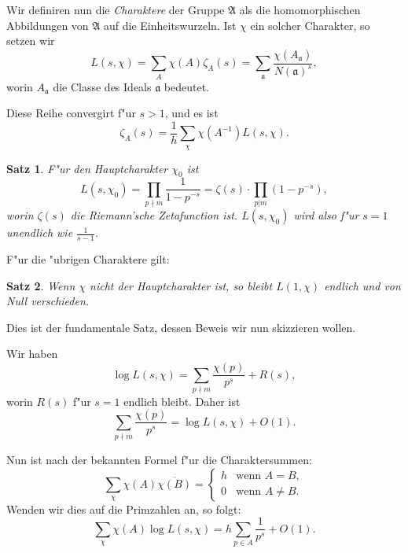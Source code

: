 \documentclass[10pt,a4paper]{article}
\theoremstyle{weberstyle}
\newtheorem{satz}{Satz}[section]
\begin{document}
Wir definiren nun die \emph{Charaktere} der Gruppe $\mathfrak{A}$ als die
homomorphischen Abbildungen von $\mathfrak{A}$ auf die Einheitswurzeln. Ist
$\chi$ ein solcher Charakter, so setzen wir
\begin{equation}\label{eq:nachtrag2.4}
L(s,\chi) = \sum_A \chi(A)\zeta_A(s) =
\sum_{\mathfrak{a}}\frac{\chi(A_{\mathfrak{a}})}{N(\mathfrak{a})^s},
\end{equation}
worin $A_{\mathfrak{a}}$ die Classe des Ideals $\mathfrak{a}$ bedeutet.

Diese Reihe convergirt f"ur $s>1$, und es ist
\begin{equation}\label{eq:nachtrag2.5}
\zeta_A(s) = \frac{1}{h}\sum_{\chi}\chi(A^{-1})L(s,\chi).
\end{equation}

\begin{satz}
F"ur den Hauptcharakter $\chi_0$ ist
\begin{equation}\label{eq:nachtrag2.6}
L(s,\chi_0) = \prod_{p\nmid m}\frac{1}{1-p^{-s}} =
\zeta(s)\cdot\prod_{p|m}(1-p^{-s}),
\end{equation}
worin $\zeta(s)$ die Riemann'sche Zetafunction ist. $L(s,\chi_0)$ wird also
f"ur $s=1$ unendlich wie $\frac{1}{s-1}$.
\end{satz}

F"ur die "ubrigen Charaktere gilt:

\begin{satz}
Wenn $\chi$ nicht der Hauptcharakter ist, so bleibt $L(1,\chi)$ endlich
und von Null verschieden.
\end{satz}

Dies ist der fundamentale Satz, dessen Beweis wir nun skizzieren wollen.

Wir haben
\[
\log L(s,\chi) = \sum_{p\nmid m}\frac{\chi(p)}{p^s} + R(s),
\]
worin $R(s)$ f"ur $s=1$ endlich bleibt. Daher ist
\begin{equation}\label{eq:nachtrag2.7}
\sum_{p\nmid m}\frac{\chi(p)}{p^s} =
\log L(s,\chi) + O(1).
\end{equation}

Nun ist nach der bekannten Formel f"ur die Charaktersummen:
\[
\sum_{\chi}\chi(A)\overline{\chi(B)} =
\begin{cases}
h & \text{wenn } A=B,\\
0 & \text{wenn } A\neq B.
\end{cases}
\]
Wenden wir dies auf die Primzahlen an, so folgt:
\[
\sum_{\chi}\chi(A)\log L(s,\chi) =
h\sum_{p\in A}\frac{1}{p^s} + O(1).
\]
\end{document}
